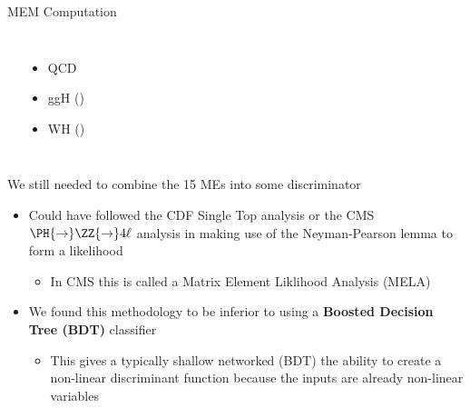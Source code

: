 \begin{frame}
\begin{block}{MEM Computation}
\begin{columns}[T]
\begin{itemize}
			\end{itemize}
			\begin{itemize}
				\item {\color{red}QCD}
				\item {\color{red}ggH (\gev)}
				\item {\color{red}WH (\gev)}
			\end{itemize}
		\end{columns}
	\end{block}
	\vspace*{-0.24cm}
	\begin{block}{We still needed to combine the 15 MEs into some discriminator}
	 	\begin{itemize}
	 		\item Could have followed the CDF Single Top analysis or the CMS $\PH{\rightarrow}\ZZ{\rightarrow}4\ell$ analysis in making use of the Neyman-Pearson lemma to form a likelihood
	 		\begin{itemize}
	 			\item In CMS this is called a Matrix Element Liklihood Analysis (MELA)
	 		\end{itemize}
	 		\item We found this methodology to be inferior to using a \textbf{Boosted Decision Tree (BDT)} classifier
	 		\begin{itemize}
	 			\item This gives a typically shallow networked (BDT) the ability to create a non-linear discriminant function because the inputs are already non-linear variables
	 		\end{itemize}
	 	\end{itemize}
	\end{block}
\end{frame}

